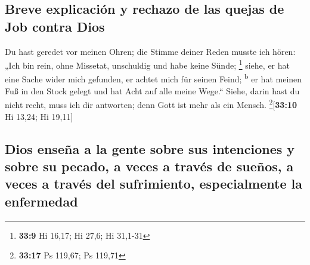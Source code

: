 \hypertarget{breve-explicaciuxf3n-y-rechazo-de-las-quejas-de-job-contra-dios}{%
\subsection{Breve explicación y rechazo de las quejas de Job contra
Dios}\label{breve-explicaciuxf3n-y-rechazo-de-las-quejas-de-job-contra-dios}}

 Du hast geredet vor meinen Ohren; die Stimme deiner Reden
musste ich hören:  „Ich bin rein, ohne Missetat,
unschuldig und habe keine Sünde; \footnote{\textbf{33:9} Hi 16,17; Hi
  27,6; Hi 31,1-31}  siehe, er hat eine Sache wider mich
gefunden, er achtet mich für seinen Feind; \textsuperscript{b}
 er hat meinen Fuß in den Stock gelegt und hat Acht auf
alle meine Wege.``  Siehe, darin hast du nicht recht,
muss ich dir antworten; denn Gott ist mehr als ein Mensch.
\footnote{\textbf{33:17} Ps 119,67; Ps 119,71}{[}\textbf{33:10} Hi
13,24; Hi 19,11{]}

\hypertarget{dios-enseuxf1a-a-la-gente-sobre-sus-intenciones-y-sobre-su-pecado-a-veces-a-travuxe9s-de-sueuxf1os-a-veces-a-travuxe9s-del-sufrimiento-especialmente-la-enfermedad}{%
\subsection{Dios enseña a la gente sobre sus intenciones y sobre su
pecado, a veces a través de sueños, a veces a través del sufrimiento,
especialmente la
enfermedad}\label{dios-enseuxf1a-a-la-gente-sobre-sus-intenciones-y-sobre-su-pecado-a-veces-a-travuxe9s-de-sueuxf1os-a-veces-a-travuxe9s-del-sufrimiento-especialmente-la-enfermedad}}

